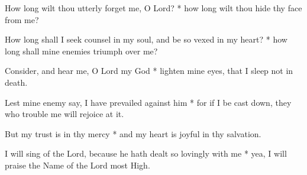 How long wilt thou utterly forget me, O Lord? * how long wilt thou hide thy face from me?

How long shall I seek counsel in my soul, and be so vexed in my heart? * how long shall mine enemies triumph over me?

Consider, and hear me, O Lord my God * lighten mine eyes, that I sleep not in death.

Lest mine enemy say, I have prevailed against him * for if I be cast down, they who trouble me will rejoice at it.

But my trust is in thy mercy * and my heart is joyful in thy salvation.

I will sing of the Lord, because he hath dealt so lovingly with me * yea, I will praise the Name of the Lord most High.
